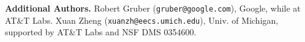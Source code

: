 \documentclass{sig-alternate-sigmod08}
\begin{document}
\noindent
\textbf{Additional Authors.}
Robert Gruber ({\small{\texttt{gruber@google.com}}}), Google,
while at AT\&T Labs.
Xuan Zheng ({\small{\texttt{xuanzh@eecs.umich.edu}}}), Univ. of Michigan, 
supported by AT\&T Labs and NSF DMS 0354600.



\end{document}
